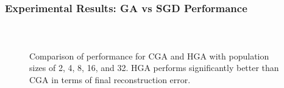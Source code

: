 \begin{frame}[t]
	\frametitle{Experimental Results: GA vs SGD Performance}
	\framesubtitle{~~}  %

\begin{figure}[h]
  \centering
  \caption{Comparison of performance for CGA and HGA with population sizes of 2, 4, 8, 16, and 32. HGA performs significantly better than CGA in terms of final reconstruction error.}
  \label{fig:ga_comparison4}
\end{figure}
\end{frame}
